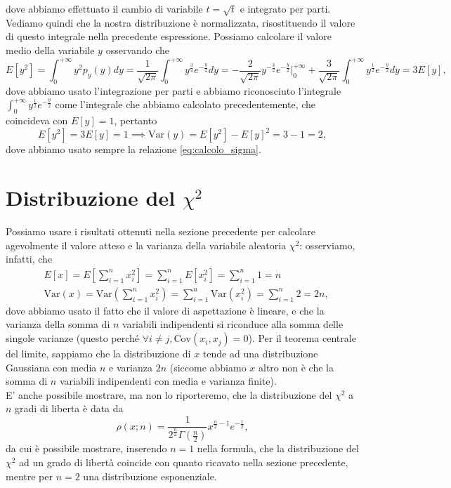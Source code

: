 \documentclass{report}
\begin{document}
dove abbiamo effettuato il cambio di variabile $t = \sqrt{t}$ e integrato per parti. Vediamo quindi che la nostra distribuzione è normalizzata, risostituendo il valore di questo integrale nella precedente espressione.
Possiamo calcolare il valore medio della variabile $y$ osservando che
$$
E[y^2] = \int_0^{+\infty} y^2 p_y(y) dy = \frac{1}{\sqrt{2 \pi}} \int_0^{+\infty} y^{\frac{3}{2}} e^{-\frac{y}{2}}dy = - \frac{2}{\sqrt{2 \pi}} y^{-\frac{3}{2}} e^{-\frac{y}{2}}\bigg|^{+\infty}_0 + \frac{3}{\sqrt{2\pi}} \int_0^{+\infty} y^{\frac{1}{2}} e^{-\frac{y}{2}}dy = 3E[y],
$$
dove abbiamo usato l'integrazione per parti e abbiamo riconosciuto l'integrale $\int_0^{+\infty} y^{\frac{1}{2}}e^{-\frac{y}{2}}$ come l'integrale che abbiamo calcolato precedentemente, che coincideva con $E[y] = 1$, pertanto
$$
	E[y^2] = 3E[y] = 1 \implies \text{Var}(y) = E[y^2] - E[y]^2 = 3 - 1 = 2,
$$
dove abbiamo usato sempre la relazione \ref{eq:calcolo_sigma}.
\section{Distribuzione del $\chi^2$}
Possiamo usare i risultati ottenuti nella sezione precedente per calcolare agevolmente il valore atteso e la varianza della variabile aleatoria $\chi^2$: osserviamo, infatti, che
\begin{align*}
&E[x] = E \left[ \sum_{i=1}^n x_i^2 \right] = \sum_{i=1}^n E[x_i^2] = \sum_{i=1}^n 1 = n \\
&\text{Var}(x) = \text{Var}\left(\sum_{i=1}^n x_i^2 \right) = \sum_{i=1}^n \text{Var}(x_i^2) = \sum_{i=1}^n 2 = 2n,
\end{align*}
dove abbiamo usato il fatto che il valore di aspettazione è lineare, e che la varianza della somma di $n$ variabili indipendenti si riconduce alla somma delle singole varianze (questo perché $\forall i \neq j, \text{Cov}(x_i, x_j) = 0$). Per il teorema centrale del limite, sappiamo che la distribuzione di $x$ tende ad una distribuzione Gaussiana con media $n$ e varianza $2n$ (siccome abbiamo $x$ altro non è che la somma di $n$ variabili indipendenti con media e varianza finite). \\
E' anche possibile mostrare, ma non lo riporteremo, che la distribuzione del $\chi^2$ a $n$ gradi di liberta è data da
$$
\mathcal{\rho}(x; n) = \frac{1}{2^{\frac{n}{2}} \Gamma(\frac{n}{2})} x^{\frac{n}{2} - 1}e^{-\frac{x}{2}},
$$
da cui è possibile mostrare, inserendo $n=1$ nella formula, che la distribuzione del $\chi^2$ ad un grado di libertà coincide con quanto ricavato nella sezione precedente, mentre per $n=2$ una distribuzione esponenziale.
\end{document}
